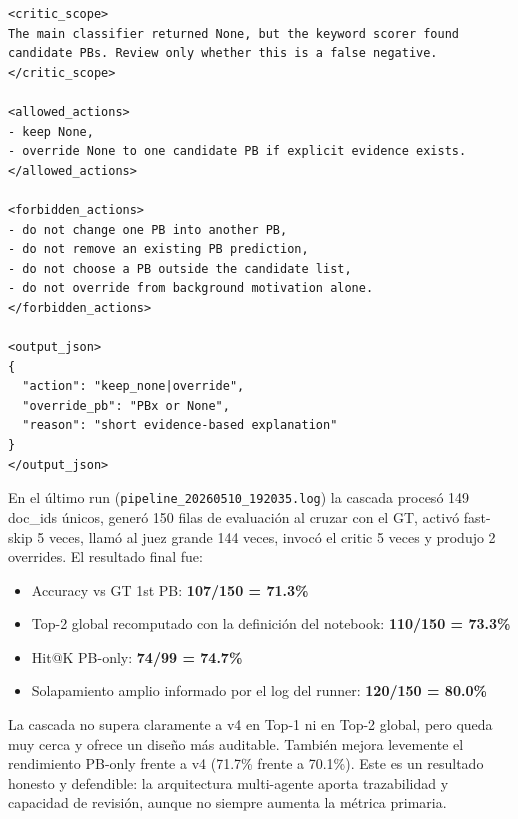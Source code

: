 {\footnotesize
\begin{verbatim}
<critic_scope>
The main classifier returned None, but the keyword scorer found
candidate PBs. Review only whether this is a false negative.
</critic_scope>

<allowed_actions>
- keep None,
- override None to one candidate PB if explicit evidence exists.
</allowed_actions>

<forbidden_actions>
- do not change one PB into another PB,
- do not remove an existing PB prediction,
- do not choose a PB outside the candidate list,
- do not override from background motivation alone.
</forbidden_actions>

<output_json>
{
  "action": "keep_none|override",
  "override_pb": "PBx or None",
  "reason": "short evidence-based explanation"
}
</output_json>
\end{verbatim}
}

En el último run (\texttt{pipeline\_20260510\_192035.log}) la cascada procesó 149 doc\_ids únicos, generó 150 filas de evaluación al cruzar con el GT, activó fast-skip 5 veces, llamó al juez grande 144 veces, invocó el critic 5 veces y produjo 2 overrides. El resultado final fue:

\begin{itemize}
\item Accuracy vs GT 1st PB: \textbf{107/150 = 71.3\%}
\item Top-2 global recomputado con la definición del notebook: \textbf{110/150 = 73.3\%}
\item Hit@K PB-only: \textbf{74/99 = 74.7\%}
\item Solapamiento amplio informado por el log del runner: \textbf{120/150 = 80.0\%}
\end{itemize}

La cascada no supera claramente a v4 en Top-1 ni en Top-2 global, pero queda muy cerca y ofrece un diseño más auditable. También mejora levemente el rendimiento PB-only frente a v4 (71.7\% frente a 70.1\%). Este es un resultado honesto y defendible: la arquitectura multi-agente aporta trazabilidad y capacidad de revisión, aunque no siempre aumenta la métrica primaria.


